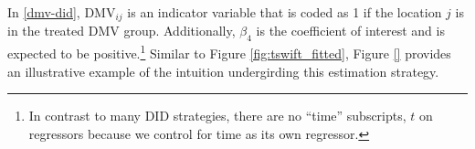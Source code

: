 \documentclass[11pt, letterpaper, twoside]{article}
\begin{document}
In \eqref{dmv-did}, $\text{DMV}_{ij}$ is an indicator variable that is coded as 1 if the location $j$ is in the treated DMV group. Additionally, $\beta_4$ is the coefficient of interest and is expected to be positive.\footnote{In contrast to many DID strategies, there are no ``time'' subscripts, $t$ on regressors because we control for time as its own regressor.} Similar to Figure \ref{fig:tswift_fitted}, Figure \ref{} provides an illustrative example of the intuition undergirding this estimation strategy.
\end{document}
